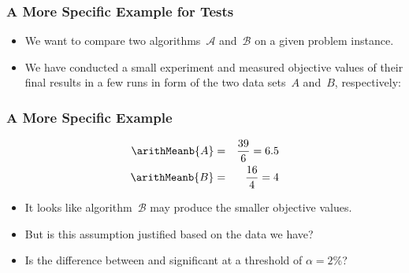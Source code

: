 \documentclass[aspectratio=169,mathserif,notheorems]{beamer}%
\begin{document}
%
%
%
\begin{frame}[t]\frametitle{A More Specific Example for Tests}%
\begin{itemize}%
\item We want to compare two algorithms~$\mathcal{A}$ and~$\mathcal{B}$ on a given problem instance.
\item<2-> We have conducted a small experiment and measured objective values of their final results in a few runs in form of the two data sets~$A$ and~$B$, respectively:
\end{itemize}%
%
%
%
\end{frame}%
%
%
\begin{frame}\frametitle{A More Specific Example}%
\begin{eqnarray}%
\arithMeanb{A} &=& \frac{39}{6} = 6.5\nonumber\\%
\arithMeanb{B} &=& \frac{16}{4} = 4\nonumber%
\end{eqnarray}%
%
\begin{itemize}%
\item It looks like algorithm~$\mathcal{B}$ may produce the smaller objective values.
\item<2-> But is this assumption justified based on the data we have?
\item<3-> Is the difference between  and  significant at a threshold of $\alpha=2\%$?
\end{itemize}%
\end{frame}%
%
\end{document}
